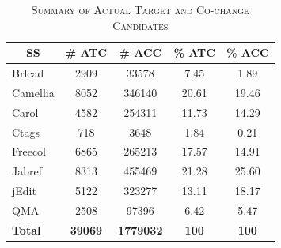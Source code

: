 \documentclass[review]{elsarticle}
\begin{document}
\begin{table}[]
\centering
\caption{\label{tab:summary-atc-acc}\textsc{Summary of Actual Target and Co-change Candidates}}
\begin{tabular}{lcccc}
\hline
\multicolumn{1}{|c|}{\textbf{SS}}    & \multicolumn{1}{c|}{\textbf{\# ATC}} & \multicolumn{1}{c|}{\textbf{\# ACC}}  & \multicolumn{1}{c|}{\textbf{\% ATC}} & \multicolumn{1}{c|}{\textbf{\% ACC}} \\ \hline
\multicolumn{1}{|l|}{Brlcad}         & \multicolumn{1}{c|}{2909}            & \multicolumn{1}{c|}{33578}            & \multicolumn{1}{c|}{7.45}            & \multicolumn{1}{c|}{1.89}            \\ \hline
\multicolumn{1}{|l|}{Camellia}       & \multicolumn{1}{c|}{8052}            & \multicolumn{1}{c|}{346140}           & \multicolumn{1}{c|}{20.61}           & \multicolumn{1}{c|}{19.46}           \\ \hline
\multicolumn{1}{|l|}{Carol}          & \multicolumn{1}{c|}{4582}            & \multicolumn{1}{c|}{254311}           & \multicolumn{1}{c|}{11.73}           & \multicolumn{1}{c|}{14.29}           \\ \hline
\multicolumn{1}{|l|}{Ctags}          & \multicolumn{1}{c|}{718}             & \multicolumn{1}{c|}{3648}             & \multicolumn{1}{c|}{1.84}            & \multicolumn{1}{c|}{0.21}            \\ \hline
\multicolumn{1}{|l|}{Freecol}        & \multicolumn{1}{c|}{6865}            & \multicolumn{1}{c|}{265213}           & \multicolumn{1}{c|}{17.57}           & \multicolumn{1}{c|}{14.91}           \\ \hline
\multicolumn{1}{|l|}{Jabref}         & \multicolumn{1}{c|}{8313}            & \multicolumn{1}{c|}{455469}           & \multicolumn{1}{c|}{21.28}           & \multicolumn{1}{c|}{25.60}           \\ \hline
\multicolumn{1}{|l|}{jEdit}          & \multicolumn{1}{c|}{5122}            & \multicolumn{1}{c|}{323277}           & \multicolumn{1}{c|}{13.11}           & \multicolumn{1}{c|}{18.17}           \\ \hline
\multicolumn{1}{|l|}{QMA}            & \multicolumn{1}{c|}{2508}            & \multicolumn{1}{c|}{97396}            & \multicolumn{1}{c|}{6.42}            & \multicolumn{1}{c|}{5.47}            \\ \hline
\multicolumn{1}{|l|}{\textbf{Total}} & \multicolumn{1}{c|}{\textbf{39069}}  & \multicolumn{1}{c|}{\textbf{1779032}} & \multicolumn{1}{c|}{\textbf{100}} & \multicolumn{1}{c|}{\textbf{100}} \\ \hline

\end{tabular}
\end{table}
\end{document}
